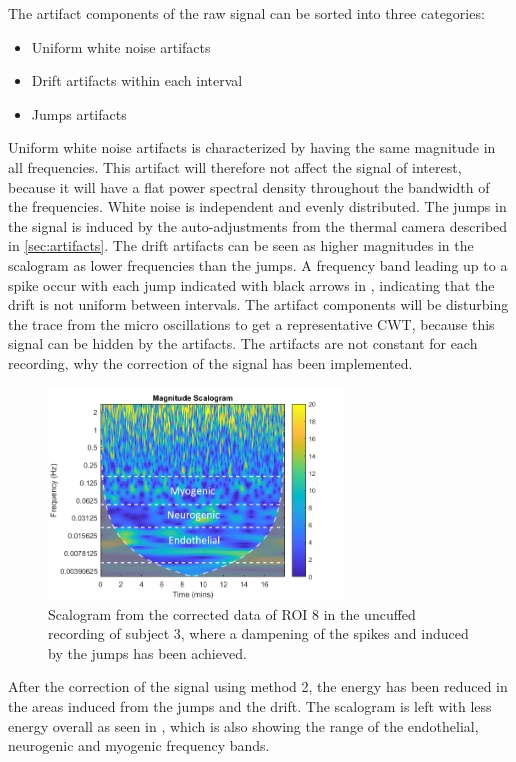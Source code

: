 The artifact components of the raw signal can be sorted into three categories: 
\begin{itemize}
	\item Uniform white noise artifacts
    \item Drift artifacts within each interval
	\item Jumps artifacts
\end{itemize}

Uniform white noise artifacts is characterized by having the same magnitude in all frequencies. This artifact will therefore not affect the signal of interest, because it will have a flat power spectral density throughout the bandwidth of the frequencies. White noise is independent and evenly distributed\cite{hida2014}. 
The jumps in the signal is induced by the auto-adjustments from the thermal camera described in \ref{sec:artifacts}. The drift artifacts can be seen as higher magnitudes in the scalogram as lower frequencies than the jumps. A frequency band leading up to a spike occur with each jump indicated with black arrows in , indicating that the drift is not uniform between intervals.
The artifact components will be disturbing the trace from the micro oscillations to get a representative CWT, because this signal can be hidden by the artifacts. The artifacts are not constant for each recording, why the correction of the signal has been implemented.

\begin{figure}[H]
	\includegraphics[width=0.7\textwidth]{figures/cwt_sub3_reg8_corr_uncuffed}
	\caption{Scalogram from the corrected data of ROI 8 in the uncuffed recording of subject 3, where a dampening of the spikes and  induced by the jumps has been achieved.}
	\label{fig:scalogram_corr}
\end{figure} 

After the correction of the signal using method 2, the energy has been reduced in the areas induced from the jumps and the drift. The scalogram is left with less energy overall as seen in , which is also showing the range of the endothelial, neurogenic and myogenic frequency bands. %

